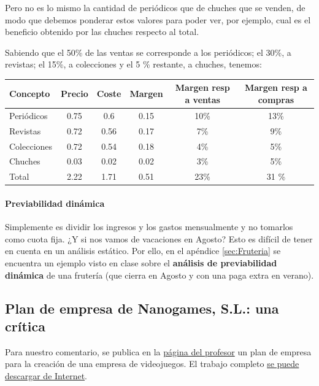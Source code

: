 \documentclass[nochap,palatino,shortheader]{apuntes}
\begin{document}
\begin{example}
Pero no es lo mismo la cantidad de periódicos que de chuches que se venden, de modo que debemos ponderar estos valores para poder ver, por ejemplo, cual es el beneficio obtenido por las chuches respecto al total.

Sabiendo que el 50\% de las ventas se corresponde a los periódicos; el 30\%, a revistas; el 15\%, a colecciones y el 5 \% restante, a chuches, tenemos:

\begin{center}
\normalfont\small
\begin{tabular}{l|c|c|c|c|c}
\textbf{Concepto} & \textbf{Precio} & \textbf{Coste} &\textbf{Margen} & \textbf{Margen resp a ventas} & \textbf{Margen resp a compras} \\
\toprule
Periódicos & 0.75 & 0.6 & 0.15 & 10\% & 13\% \\
Revistas & 0.72 & 0.56 & 0.17 & 7\% & 9\%\\
Colecciones & 0.72 & 0.54 & 0.18 & 4\% & 5\%\\
Chuches &0.03 & 0.02 & 0.02 & 3\% & 5\%\\
\bottomrule
Total & 2.22 & 1.71 & 0.51 & 23\% & 31 \% \\
\end{tabular}
\end{center}

\end{example}

\paragraph{Previabilidad dinámica}
Simplemente es dividir los ingresos y los gastos mensualmente y no tomarlos como cuota fija. ¿Y si nos vamos de vacaciones en Agosto? Esto es difícil de tener en cuenta en un análisis estático.
Por ello, en el apéndice \ref{sec:Fruteria} se encuentra un ejemplo visto en clase sobre el \textbf{análisis de previabilidad dinámica} de una frutería (que cierra en Agosto y con una paga extra en verano).

\subsection{Plan de empresa de Nanogames, S.L.: una crítica}

Para nuestro comentario, se publica en la \href{http://maestremiranda.com/techdir/plan-de-empresa-de-videojuegos-nanogames-s-l/}{página del profesor} un plan de empresa para la creación de una empresa de videojuegos. El trabajo completo \href{https://riunet.upv.es/bitstream/handle/10251/15241/proyecto%20FINAL.pdf}{se puede descargar de Internet}.
\end{document}
